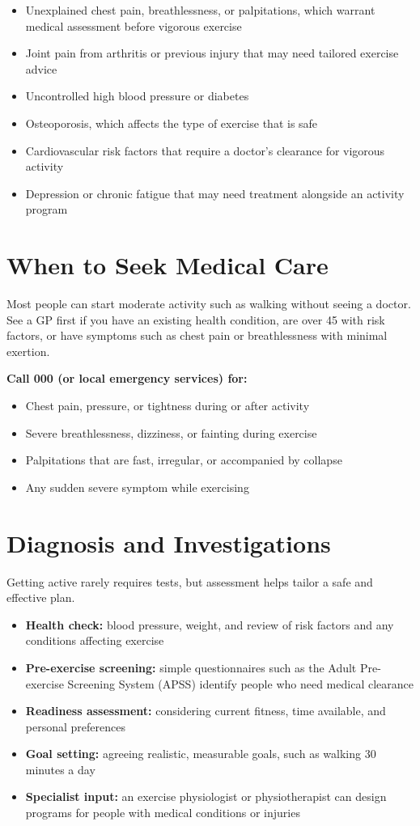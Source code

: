\begin{itemize}
    \item Unexplained chest pain, breathlessness, or palpitations, which warrant medical assessment before vigorous exercise
    \item Joint pain from arthritis or previous injury that may need tailored exercise advice
    \item Uncontrolled high blood pressure or diabetes
    \item Osteoporosis, which affects the type of exercise that is safe
    \item Cardiovascular risk factors that require a doctor's clearance for vigorous activity
    \item Depression or chronic fatigue that may need treatment alongside an activity program
\end{itemize}

\section*{When to Seek Medical Care}
Most people can start moderate activity such as walking without seeing a doctor. See a GP first if you have an existing health condition, are over 45 with risk factors, or have symptoms such as chest pain or breathlessness with minimal exertion.

\textbf{Call 000 (or local emergency services) for:}
\begin{itemize}
    \item Chest pain, pressure, or tightness during or after activity
    \item Severe breathlessness, dizziness, or fainting during exercise
    \item Palpitations that are fast, irregular, or accompanied by collapse
    \item Any sudden severe symptom while exercising
\end{itemize}

\section*{Diagnosis and Investigations}
Getting active rarely requires tests, but assessment helps tailor a safe and effective plan.

\begin{itemize}
    \item \textbf{Health check:} blood pressure, weight, and review of risk factors and any conditions affecting exercise
    \item \textbf{Pre-exercise screening:} simple questionnaires such as the Adult Pre-exercise Screening System (APSS) identify people who need medical clearance
    \item \textbf{Readiness assessment:} considering current fitness, time available, and personal preferences
    \item \textbf{Goal setting:} agreeing realistic, measurable goals, such as walking 30 minutes a day
    \item \textbf{Specialist input:} an exercise physiologist or physiotherapist can design programs for people with medical conditions or injuries
\end{itemize}

